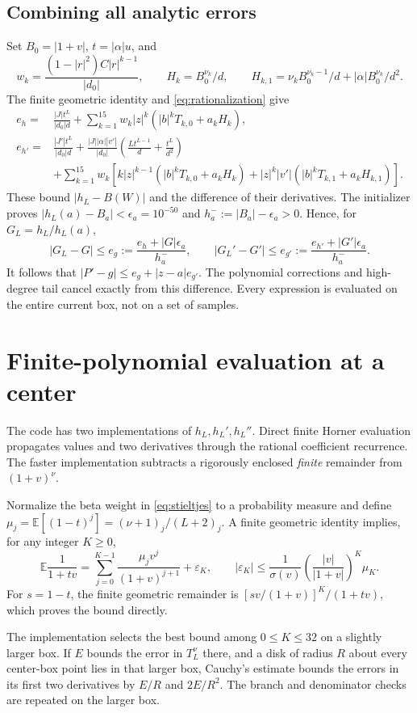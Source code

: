 \documentclass[11pt,a4paper]{article}
\begin{document}
\subsection{Combining all analytic errors}
Set $B_0=|1+v|$, $t=|\alpha|u$, and
\[
 w_k=\frac{(1-|r|^2)C|r|^{k-1}}{|d_0|},\qquad
 H_k=B_0^{\nu_k}/d,\qquad
 H_{k,1}=\nu_kB_0^{\nu_k-1}/d+|\alpha|B_0^{\nu_k}/d^2.
\]
The finite geometric identity and \eqref{eq:rationalization} give
\begin{align*}
 e_h={}&\frac{|J|t^L}{|d_0|d}+
 \sum_{k=1}^{15}w_k|z|^k(|b|^kT_{k,0}+a_kH_k),\\
 e_{h'}={}&\frac{|J'|t^L}{|d_0|d}+
 \frac{|J||\alpha||v'|}{|d_0|}
             \left(\frac{Lt^{L-1}}d+\frac{t^L}{d^2}\right)\\
 &+\sum_{k=1}^{15}w_k\left[
 k|z|^{k-1}(|b|^kT_{k,0}+a_kH_k)
 +|z|^k|v'|(|b|^kT_{k,1}+a_kH_{k,1})\right].
\end{align*}
These bound $|h_L-B(W)|$ and the difference of their derivatives.
The initializer proves $|h_L(a)-B_a|<\epsilon_a=10^{-50}$ and
$h_a^-:=|B_a|-\epsilon_a>0$. Hence, for $G_L=h_L/h_L(a)$,
\[
 |G_L-G|\le e_g:=\frac{e_h+|G|\epsilon_a}{h_a^-},\qquad
 |G_L'-G'|\le e_{g'}:=\frac{e_{h'}+|G'|\epsilon_a}{h_a^-}.
\]
It follows that $|P'-g|\le e_g+|z-a|e_{g'}$. The polynomial corrections and
high-degree tail cancel exactly from this difference. Every expression is
evaluated on the entire current box, not on a set of samples.

\section{Finite-polynomial evaluation at a center}\label{sec:evaluation}
The code has two implementations of $h_L,h_L',h_L''$. Direct finite Horner
evaluation propagates values and two derivatives through the rational
coefficient recurrence. The faster implementation subtracts a rigorously
enclosed \emph{finite} remainder from $(1+v)^\nu$.

Normalize the beta weight in \eqref{eq:stieltjes} to a probability measure and
define $\mu_j=\mathbb E[(1-t)^j]=(\nu+1)_j/(L+2)_j$. A finite geometric identity
implies, for any integer $K\ge0$,
\[
 \mathbb E\frac1{1+tv}=\sum_{j=0}^{K-1}
 \frac{\mu_jv^j}{(1+v)^{j+1}}+\varepsilon_K,
 \qquad
 |\varepsilon_K|\le
 \frac1{\sigma(v)}\left(\frac{|v|}{|1+v|}\right)^K\mu_K.
\]
For $s=1-t$, the finite geometric remainder is
$[sv/(1+v)]^K/(1+tv)$, which proves the bound directly.

The implementation selects the best bound among $0\le K\le32$ on a slightly
larger box. If $E$ bounds the error in $T_L^\nu$ there, and a disk of radius
$R$ about every center-box point lies in that larger box, Cauchy's estimate
bounds the errors in its first two derivatives by $E/R$ and $2E/R^2$.
The branch and denominator checks are repeated on the larger box.
\end{document}
